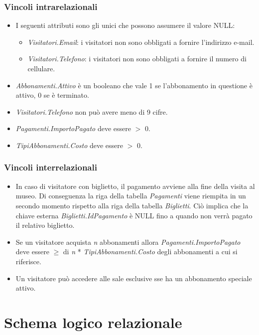 \documentclass[a4paper, 12pt]{article}
\begin{document}
\subsubsection{Vincoli intrarelazionali}
\begin{itemize}
    \item I seguenti attributi sono gli unici che possono assumere il valore NULL:
    \begin{itemize}
        \item \textit{Visitatori.Email}: i visitatori non sono obbligati a fornire l'indirizzo e-mail.
        \item \textit{Visitatori.Telefono}: i visitatori non sono obbligati a fornire il numero di cellulare.
    \end{itemize}
    \item \textit{Abbonamenti.Attivo} è un booleano che vale 1 se l'abbonamento in questione è attivo, 0 se è terminato.
    \item \textit{Visitatori.Telefono} non può avere meno di 9 cifre.
    \item \textit{Pagamenti.ImportoPagato} deve essere $>$ 0.
    \item \textit{TipiAbbonamenti.Costo} deve essere $>$ 0.
\end{itemize}

\subsubsection{Vincoli interrelazionali}
    \begin{itemize}
        \item In caso di visitatore con biglietto, il pagamento avviene alla fine della visita al museo. Di conseguenza la riga della tabella \textit{Pagamenti} viene riempita in un secondo momento rispetto alla riga della tabella \textit{Biglietti}. Ciò implica che la chiave esterna \textit{Biglietti.IdPagamento} è NULL fino a quando non verrà pagato il relativo biglietto.
        \item Se un visitatore acquista \textit{n} abbonamenti allora \textit{Pagamenti.ImportoPagato} deve essere $\geq$ di \textit{n} * \textit{TipiAbbonamenti.Costo} degli abbonamenti a cui si riferisce.
        \item Un visitatore può accedere alle sale esclusive sse ha un abbonamento speciale attivo.
    \end{itemize}

\section{Schema logico relazionale}
\end{document}
